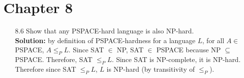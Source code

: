\section{Chapter 8}

\begin{enumerate}

\item[8.6]Show that any PSPACE-hard language is also NP-hard.
\\
\textbf{Solution:} by definition of PSPACE-hardness for a language $L$, for all $A \in$ PSPACE, $A \le_P L$. Since SAT $\in$ NP, SAT $\in$ PSPACE because NP $\subseteq$ PSPACE. Therefore, SAT $\le_P L$. Since SAT is NP-complete, it is NP-hard. Therefore since SAT $\le_P L$, $L$ is NP-hard (by transitivity of $\le_P$).

\end{enumerate}